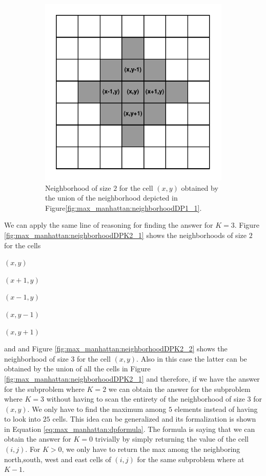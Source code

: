\begin{figure}
	\begin{subfigure}[t]{0.4\textwidth}
		\centering
		\includegraphics[width=\textwidth]{sources/max_manhattan/images/neighborhoodDP1_2}
		\caption[]{Neighborhood of size $2$ for the cell $(x,y)$ obtained by the union of the neighborhood depicted in Figure\ref{fig:max_manhattan:neighborhoodDP1_1}.}
		\label{fig:max_manhattan:neighborhoodDP1_2}
	 \end{subfigure}
	 \label{}
	 \caption{}
\end{figure}

We can apply the same line of reasoning for finding the answer for $K=3$. Figure \ref{fig:max_manhattan:neighborhoodDPK2_1} shows  the neighborhoods of size $2$ for the cells 
\begin{itemize*}
	\item $(x,y)$
	\item $(x+1,y)$
	\item $(x-1,y)$
	\item $(x,y-1)$
	\item $(x,y+1)$
\end{itemize*} and and Figure \ref{fig:max_manhattan:neighborhoodDPK2_2} shows  the neighborhood of size $3$ for the cell $(x,y)$.
Also in this case the latter can be obtained by the union of all the cells in Figure \ref{fig:max_manhattan:neighborhoodDPK2_1} and therefore, 
if we have the answer for the subproblem where $K=2$ we can obtain the answer for the subproblem where $K=3$
without having to scan the entirety of the neighborhood of size $3$ for $(x,y)$. We only have to find the maximum among $5$ elements instead of having to look into $25$ cells. 
This idea can be generalized and its formalization is shown in Equation \ref{eq:max_manhattan:dpformula}.
The formula is saying that we can obtain the answer for $K=0$ trivially by simply returning the value of the cell $(i,j)$. 
For $K>0$, we only have to return the max among the neighboring north,south, west and east cells of $(i,j)$ for the same subproblem where at $K-1$.

